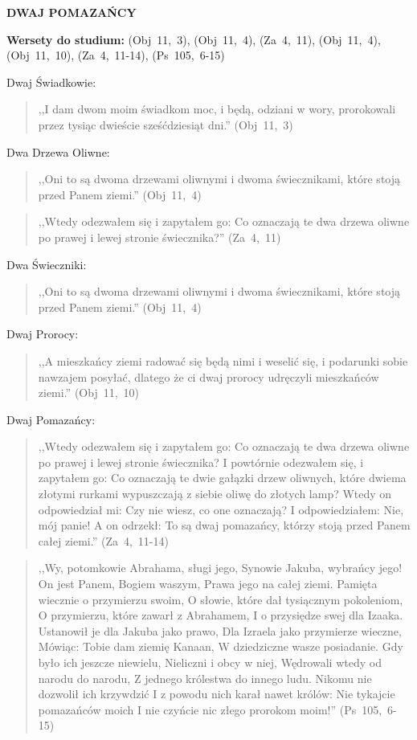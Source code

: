 \documentclass[10pt,a4paper,oneside]{article}
\begin{document}
\centerline{\textbf{\MakeUppercase{Dwaj Pomazańcy}}}
\begin{center}
\textbf{Wersety do studium:} \mbox{(Obj 11, 3)}, \mbox{(Obj 11, 4)}, \mbox{(Za 4, 11)}, \mbox{(Obj 11, 4)}, \mbox{(Obj 11, 10)}, \mbox{(Za 4, 11-14)}, \mbox{(Ps 105, 6-15)}
\end{center}
Dwaj Świadkowie:
\begin{quote}
,,I dam dwom moim świadkom moc, i będą, odziani w wory, prorokowali przez tysiąc dwieście sześćdziesiąt dni.'' \mbox{(Obj 11, 3)}
\end{quote}
Dwa Drzewa Oliwne:
\begin{quote}
,,Oni to są dwoma drzewami oliwnymi i dwoma świecznikami, które stoją przed Panem ziemi.'' \mbox{(Obj 11, 4)}
\end{quote}
\begin{quote}
,,Wtedy odezwałem się i zapytałem go: Co oznaczają te dwa drzewa oliwne po prawej i lewej stronie świecznika?'' \mbox{(Za 4, 11)}
\end{quote}
Dwa Świeczniki:
\begin{quote}
,,Oni to są dwoma drzewami oliwnymi i dwoma świecznikami, które stoją przed Panem ziemi.'' \mbox{(Obj 11, 4)}
\end{quote}
Dwaj Prorocy:
\begin{quote}
,,A mieszkańcy ziemi radować się będą nimi i weselić się, i podarunki sobie nawzajem posyłać, dlatego że ci dwaj prorocy udręczyli mieszkańców ziemi.'' \mbox{(Obj 11, 10)}
\end{quote}
Dwaj Pomazańcy:
\begin{quote}
,,Wtedy odezwałem się i zapytałem go: Co oznaczają te dwa drzewa oliwne po prawej i lewej stronie świecznika? I powtórnie odezwałem się, i zapytałem go: Co oznaczają te dwie gałązki drzew oliwnych, które dwiema złotymi rurkami wypuszczają z siebie oliwę do złotych lamp? Wtedy on odpowiedział mi: Czy nie wiesz, co one oznaczają? I odpowiedziałem: Nie, mój panie! A on odrzekł: To są dwaj pomazańcy, którzy stoją przed Panem całej ziemi.'' \mbox{(Za 4, 11-14)}
\end{quote}
\begin{quote}
,,Wy, potomkowie Abrahama, sługi jego, Synowie Jakuba, wybrańcy jego! On jest Panem, Bogiem waszym, Prawa jego na całej ziemi. Pamięta wiecznie o przymierzu swoim, O słowie, które dał tysiącznym pokoleniom, O przymierzu, które zawarł z Abrahamem, I o przysiędze swej dla Izaaka. Ustanowił je dla Jakuba jako prawo, Dla Izraela jako przymierze wieczne, Mówiąc: Tobie dam ziemię Kanaan, W dziedziczne wasze posiadanie. Gdy było ich jeszcze niewielu, Nieliczni i obcy w niej, Wędrowali wtedy od narodu do narodu, Z jednego królestwa do innego ludu. Nikomu nie dozwolił ich krzywdzić I z powodu nich karał nawet królów: Nie tykajcie pomazańców moich I nie czyńcie nic złego prorokom moim!'' \mbox{(Ps 105, 6-15)}
\end{quote}
\end{document}
